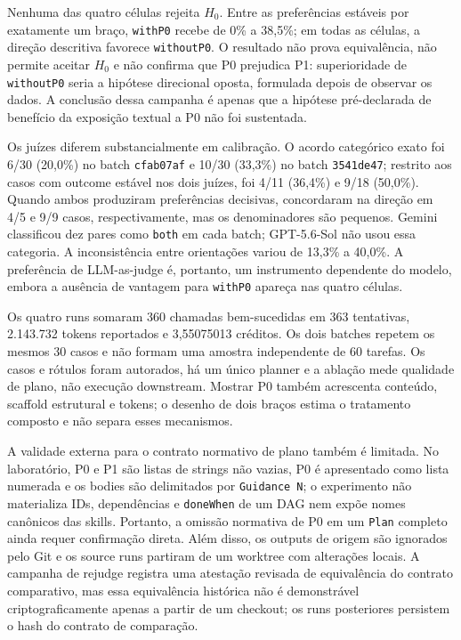 \documentclass[12pt,a4paper]{article}
\begin{document}
Nenhuma das quatro células rejeita \(H_0\). Entre as preferências estáveis por exatamente um braço, \texttt{withP0} recebe de 0\% a 38,5\%; em todas as células, a direção descritiva favorece \texttt{withoutP0}. O resultado não prova equivalência, não permite aceitar \(H_0\) e não confirma que P0 prejudica P1: superioridade de \texttt{withoutP0} seria a hipótese direcional oposta, formulada depois de observar os dados. A conclusão dessa campanha é apenas que a hipótese pré-declarada de benefício da exposição textual a P0 não foi sustentada.

Os juízes diferem substancialmente em calibração. O acordo categórico exato foi 6/30 (20,0\%) no batch \texttt{cfab07af} e 10/30 (33,3\%) no batch \texttt{3541de47}; restrito aos casos com outcome estável nos dois juízes, foi 4/11 (36,4\%) e 9/18 (50,0\%). Quando ambos produziram preferências decisivas, concordaram na direção em 4/5 e 9/9 casos, respectivamente, mas os denominadores são pequenos. Gemini classificou dez pares como \texttt{both} em cada batch; GPT-5.6-Sol não usou essa categoria. A inconsistência entre orientações variou de 13,3\% a 40,0\%. A preferência de LLM-as-judge é, portanto, um instrumento dependente do modelo, embora a ausência de vantagem para \texttt{withP0} apareça nas quatro células.

Os quatro runs somaram 360 chamadas bem-sucedidas em 363 tentativas, 2.143.732 tokens reportados e 3,55075013 créditos. Os dois batches repetem os mesmos 30 casos e não formam uma amostra independente de 60 tarefas. Os casos e rótulos foram autorados, há um único planner e a ablação mede qualidade de plano, não execução downstream. Mostrar P0 também acrescenta conteúdo, scaffold estrutural e tokens; o desenho de dois braços estima o tratamento composto e não separa esses mecanismos.

A validade externa para o contrato normativo de plano também é limitada. No laboratório, P0 e P1 são listas de strings não vazias, P0 é apresentado como lista numerada e os bodies são delimitados por \texttt{Guidance N}; o experimento não materializa IDs, dependências e \texttt{doneWhen} de um DAG nem expõe nomes canônicos das skills. Portanto, a omissão normativa de P0 em um \texttt{Plan} completo ainda requer confirmação direta. Além disso, os outputs de origem são ignorados pelo Git e os source runs partiram de um worktree com alterações locais. A campanha de rejudge registra uma atestação revisada de equivalência do contrato comparativo, mas essa equivalência histórica não é demonstrável criptograficamente apenas a partir de um checkout; os runs posteriores persistem o hash do contrato de comparação.
\end{document}

